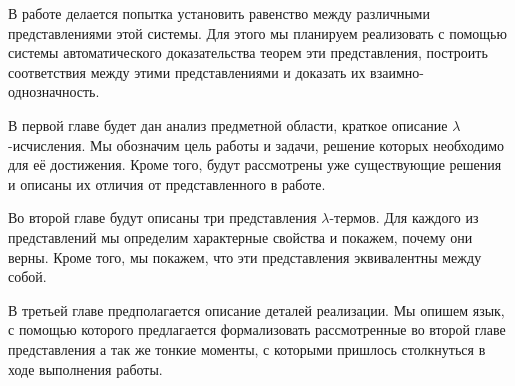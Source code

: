 В работе делается попытка установить равенство между различными представлениями этой системы. Для этого мы планируем реализовать с помощью системы автоматического доказательства теорем эти представления, построить соответствия между этими представлениями и доказать их взаимно-однозначность.

В первой главе будет дан анализ предметной области, краткое описание $\lambda$-исчисления. Мы обозначим цель работы и задачи, решение которых необходимо для её достижения. Кроме того, будут рассмотрены уже существующие решения и описаны их отличия от представленного в работе.

Во второй главе будут описаны три представления $\lambda$-термов. Для каждого из представлений мы определим характерные свойства и покажем, почему они верны. Кроме того, мы покажем, что эти представления эквивалентны между собой.

В третьей главе предполагается описание деталей реализации. Мы опишем язык, с помощью которого предлагается формализовать рассмотренные во второй главе представления а так же тонкие моменты, с которыми пришлось столкнуться в ходе выполнения работы.
